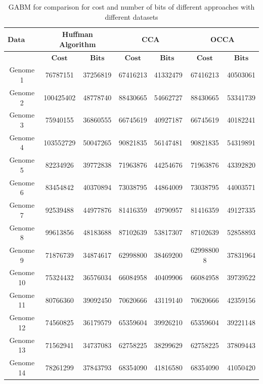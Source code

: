\documentclass[preprint,12pt]{elsarticle}
\begin{document}
\begin{table}
\small
\label{datas}
\caption{GABM for comparison for cost and number of bits of different approaches with different datasets}
\begin{center}
\begin{tabular}{c | c c | c c | c c}
\toprule
$\textbf{Data sets}$ & \multicolumn{2}{c}{Huffman Algorithm} & \multicolumn{2}{c}{CCA }& \multicolumn{2}{c}{OCCA}\\\hline
 & $\textbf{Cost}$	& $\textbf{Bits}$ &	$\textbf{Cost}$&	$\textbf{Bits	}$&$\textbf{Cost}$&	$\textbf{Bits}$
\\\hline
Genome 1&76787151  &	37256819	&67416213 & 41332479	& 67416213 & 40503061 \\\hline
Genome 2& 100425402 &  	48778740	& 88430665	& 54662727	& 88430665&  53341739 \\\hline
Genome 3&75940155  	&36860555	&66745619	&40927187 &	66745619 & 40182241\\\hline
Genome 4&103552729  	&50047265	&90821835&	56147481&	90821835  & 54319891\\\hline
Genome 5&82234926  &	39772838	&71963876	&44254676 &	71963876 & 43392820\\\hline
Genome 6&83454842  	&40370894	&73038795	&44864009	&73038795 & 44003571\\\hline
Genome 7&92539488  &	44977876&	81416359&	49790957	&81416359 & 49127335\\\hline
Genome 8&99613856 & 	48183688	&87102639&	53817307	&87102639&	52858893\\\hline
Genome 9&71876739 &	34874617&	62998800 &	38469200&	62998800 8&	37831964\\\hline
Genome 10&75324432 & 	36576034	&66084958&	40409906	&66084958&	39739522\\\hline
Genome 11&80766360  &	39092450&	70620666	&43119140&	70620666&	42359156 \\\hline
Genome 12&74560825  &	36179579&	65359604	&39926210	&65359604&	39221148\\\hline
Genome 13&71562941 & 	34737083	&62758225 &	38299629&	62758225 &	37809443\\\hline
Genome 14&78261299 & 	37843793&	68354090&	41816580&	68354090&	 41050420\\\hline
\bottomrule
\end{tabular}
\end{center}
\end{table}
\end{document}
